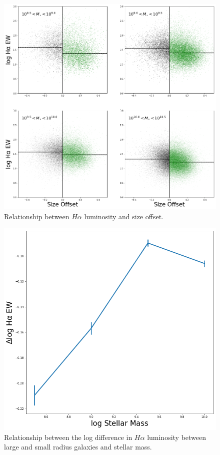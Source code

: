 \documentclass[iop]{emulateapj}
\begin{document}
\begin{figure}
	\centering
	\includegraphics[width=1.5 \columnwidth]{ha_ew_2x2.png}
	\caption{Relationship between $H\alpha$ luminosity and size offset. }
	\label{fig:HA_ew}
	
\end{figure}

\begin{figure}
	\centering
	\includegraphics[width= \columnwidth]{ratios_ha_ew.png}
	\caption{Relationship between the log difference in $H\alpha$ luminosity between large and small radius galaxies and stellar mass. }
	\label{fig:HA_ew_mass}
	
\end{figure}
\end{document}
